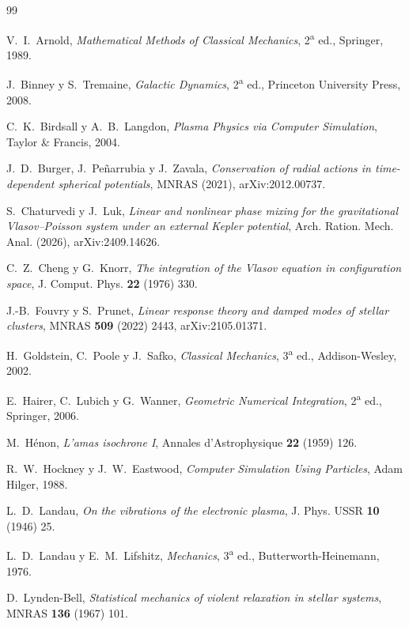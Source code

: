 \documentclass[11pt,a4paper]{article}
\begin{document}
\begin{thebibliography}{99}

V.~I.~Arnold, \emph{Mathematical Methods of Classical Mechanics}, 2\textsuperscript{a}
ed., Springer, 1989.

J.~Binney y S.~Tremaine, \emph{Galactic Dynamics}, 2\textsuperscript{a} ed., Princeton
University Press, 2008.

C.~K.~Birdsall y A.~B.~Langdon, \emph{Plasma Physics via Computer Simulation}, Taylor \&
Francis, 2004.

J.~D.~Burger, J.~Peñarrubia y J.~Zavala, \emph{Conservation of radial actions in
time-dependent spherical potentials}, MNRAS (2021), arXiv:2012.00737.

S.~Chaturvedi y J.~Luk, \emph{Linear and nonlinear phase mixing for the gravitational
Vlasov--Poisson system under an external Kepler potential}, Arch. Ration. Mech. Anal.
(2026), arXiv:2409.14626.

C.~Z.~Cheng y G.~Knorr, \emph{The integration of the Vlasov equation in configuration
space}, J. Comput. Phys. \textbf{22} (1976) 330.

J.-B.~Fouvry y S.~Prunet, \emph{Linear response theory and damped modes of stellar
clusters}, MNRAS \textbf{509} (2022) 2443, arXiv:2105.01371.

H.~Goldstein, C.~Poole y J.~Safko, \emph{Classical Mechanics}, 3\textsuperscript{a} ed.,
Addison-Wesley, 2002.

E.~Hairer, C.~Lubich y G.~Wanner, \emph{Geometric Numerical Integration},
2\textsuperscript{a} ed., Springer, 2006.

M.~Hénon, \emph{L'amas isochrone I}, Annales d'Astrophysique \textbf{22} (1959) 126.

R.~W.~Hockney y J.~W.~Eastwood, \emph{Computer Simulation Using Particles}, Adam Hilger,
1988.

L.~D.~Landau, \emph{On the vibrations of the electronic plasma}, J. Phys. USSR \textbf{10}
(1946) 25.

L.~D.~Landau y E.~M.~Lifshitz, \emph{Mechanics}, 3\textsuperscript{a} ed.,
Butterworth-Heinemann, 1976.

D.~Lynden-Bell, \emph{Statistical mechanics of violent relaxation in stellar systems},
MNRAS \textbf{136} (1967) 101.


\end{thebibliography}
\end{document}
